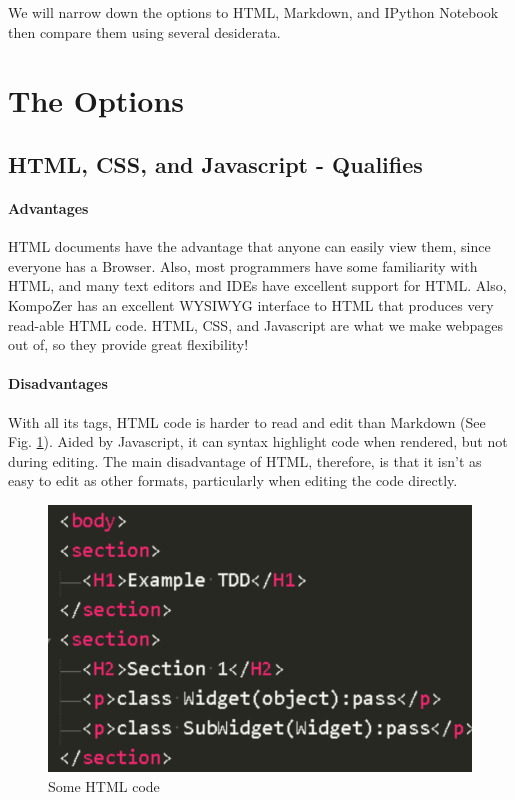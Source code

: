 \documentclass[12pt]{Report}
\begin{document}
We will narrow down the options to HTML, Markdown, and IPython Notebook then compare them using several desiderata.


\section{The Options}

\subsection{HTML, CSS, and Javascript - Qualifies}
	\paragraph{Advantages}
		HTML documents have the advantage that anyone can easily view them, since everyone has a Browser.  
		Also, most programmers have some familiarity with HTML, and many text editors and IDEs have excellent support for HTML.  
		Also, KompoZer has an excellent WYSIWYG interface to HTML that produces very read-able HTML code.  
		HTML, CSS, and Javascript are what we make webpages out of, so they provide great flexibility!
	\paragraph{Disadvantages}
		With all its tags, HTML code is harder to read and edit than Markdown (See Fig. \ref{HTML code}).  
		Aided by Javascript, it can syntax highlight code when rendered, but not during editing.  
		The main disadvantage of HTML, therefore, is that it isn't as easy to edit as other formats, particularly when editing the code directly.
		\begin{figure}[h]
			\centering
			\includegraphics[scale=.25]{HTML_code.PNG}
			\caption{Some HTML code}
			\label{HTML code}
		\end{figure}
		
\end{document}

